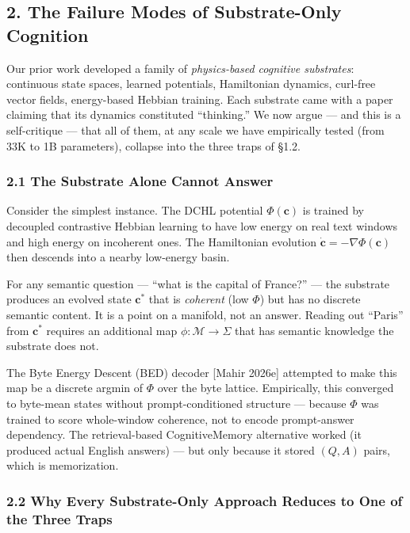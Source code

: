 \documentclass[
  11pt,
  a4paper,
]{article}
\begin{document}
\subsection{2. The Failure Modes of Substrate-Only
Cognition}\label{the-failure-modes-of-substrate-only-cognition}

Our prior work developed a family of \emph{physics-based cognitive
substrates}: continuous state spaces, learned potentials, Hamiltonian
dynamics, curl-free vector fields, energy-based Hebbian training. Each
substrate came with a paper claiming that its dynamics constituted
``thinking.'' We now argue --- and this is a self-critique --- that all
of them, at any scale we have empirically tested (from 33K to 1B
parameters), collapse into the three traps of §1.2.

\subsubsection{2.1 The Substrate Alone Cannot
Answer}\label{the-substrate-alone-cannot-answer}

Consider the simplest instance. The DCHL potential \(\Phi(\mathbf{c})\)
is trained by decoupled contrastive Hebbian learning to have low energy
on real text windows and high energy on incoherent ones. The Hamiltonian
evolution \(\dot{\mathbf{c}} = -\nabla\Phi(\mathbf{c})\) then descends
into a nearby low-energy basin.

For any semantic question --- ``what is the capital of France?'' --- the
substrate produces an evolved state \(\mathbf{c}^*\) that is
\emph{coherent} (low \(\Phi\)) but has no discrete semantic content. It
is a point on a manifold, not an answer. Reading out ``Paris'' from
\(\mathbf{c}^*\) requires an additional map
\(\phi: \mathcal{M} \to \Sigma\) that has semantic knowledge the
substrate does not.

The Byte Energy Descent (BED) decoder {[}Mahir 2026e{]} attempted to
make this map be a discrete argmin of \(\Phi\) over the byte lattice.
Empirically, this converged to byte-mean states without
prompt-conditioned structure --- because \(\Phi\) was trained to score
whole-window coherence, not to encode prompt-answer dependency. The
retrieval-based CognitiveMemory alternative worked (it produced actual
English answers) --- but only because it stored \((Q, A)\) pairs, which
is memorization.

\subsubsection{2.2 Why Every Substrate-Only Approach Reduces to One of
the Three
Traps}\label{why-every-substrate-only-approach-reduces-to-one-of-the-three-traps}
\end{document}
